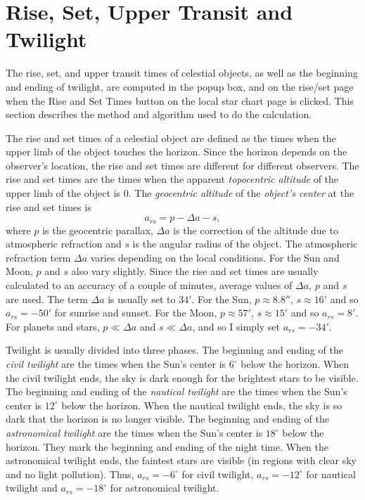 \documentclass[12pt]{article}
\newcommand \beq {\begin{equation}}
\newcommand \eeq {\end{equation}}
\begin{document}
\section{Rise, Set, Upper Transit and Twilight}

The rise, set, and upper transit times of celestial objects, as well as the beginning and 
ending of twilight, are computed in the popup box, and on the rise/set page when  
the Rise and Set Times button on the local star chart page is clicked. This section describes 
the method and algorithm used to do the calculation.

The rise and set times of a celestial object are defined as the times 
when the upper limb of the object touches the horizon.
Since the horizon depends on the observer's 
location, the rise and set times are different for different observers. 
The rise and set times are the times when the apparent {\em topocentric 
altitude} of the upper limb of the object is 0. 
The {\em geocentric altitude} of the {\em object's center} at the rise and set 
times is 
\beq
  a_{rs} = p - \Delta a - s , 
\eeq
where $p$ is the geocentric parallax, $\Delta a$ is the correction of the 
altitude due to atmospheric refraction and $s$ is the angular radius of the 
object. The atmospheric refraction term $\Delta a$ varies depending on the 
local conditions. For the Sun and Moon, $p$ and $s$ also vary slightly. Since 
the rise and set times are usually calculated to an accuracy of a couple of minutes, 
average values of $\Delta a$, $p$ and $s$ are used. The term $\Delta a$ is usually set 
to $34'$. For the Sun, $p \approx 8.8''$, $s\approx 16'$ and so $a_{rs}=-50'$ for 
sunrise and sunset. For the Moon, $p\approx 57'$, $s\approx 15'$ and so $a_{rs}=8'$. 
For planets and stars, $p \ll \Delta a$ and $s \ll \Delta a$, and so I simply 
set $a_{rs}=-34'$. 

Twilight is usually divided into three phases. The beginning and ending 
of the {\em civil twilight} are the times when the Sun's center is $6^\circ$ below 
the horizon. When the civil twilight ends, the sky is dark enough for the 
brightest stars to be visible. The beginning and ending of the {\em nautical 
twilight} are the times when the Sun's center is $12^\circ$ below the horizon. When the 
nautical twilight ends, the sky is so dark that the horizon is no longer visible. 
The beginning and ending of the {\em astronomical twilight} are the times when 
the Sun's center is $18^\circ$ below the horizon. They mark the beginning and ending 
of the night time. When the astronomical twilight ends, the faintest stars 
are visible (in regions with clear sky and no light pollution). Thus, $a_{rs}=-6^\circ$ 
for civil twilight, $a_{rs}=-12^\circ$ for nautical twilight and 
$a_{rs}=-18^\circ$ for astronomical twilight.
\end{document}
